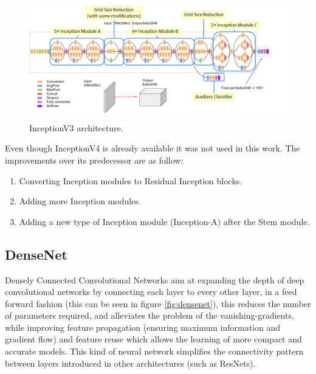     \begin{figure}[htb]
        \centering
        \includegraphics[scale = 0.4]{Sections/2StateOfTheArt/2_images/inceptionv3_architecture.png}
        \caption{InceptionV3 architecture.\cite{inceptionV3web}} 
    \end{figure}

    \par Even though InceptionV4 \cite{szegedy2016inceptionv4} is already available it was not used in this work. The improvements over its predecessor are as follow: 
    \begin{enumerate}
        \item Converting Inception modules to Residual Inception blocks.
        \item Adding more Inception modules.
        \item Adding a new type of Inception module (Inception-A) after the Stem module.
    \end{enumerate}
    
    
    
   

    \newpage
    \subsection{DenseNet}

    Densely Connected Convolutional Networks aim at expanding the depth of deep convolutional networks by connecting each layer to every other layer, in a feed forward fashion (this can be seen in figure \ref{fig:densenet}), this reduces  the number of parameters required, and alleviates the problem of the vanishing-gradients, while improving feature propagation (ensuring maximum information and gradient flow) and feature reuse which allows the learning of more compact and accurate models. This kind of neural network simplifies the connectivity pattern between layers introduced in other architectures (such as ResNets). \cite{Szegedy2016} \par

